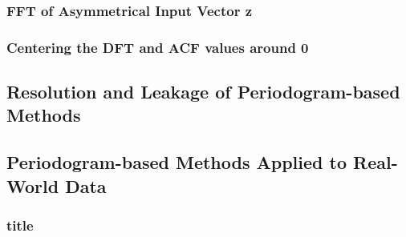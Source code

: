\documentclass[main.tex]{subfiles}
\begin{document}
\subsubsection{FFT of Asymmetrical Input Vector z}

\subsubsection{Centering the DFT and ACF values around 0}










\subsection{Resolution and Leakage of Periodogram-based Methods}











\subsection{Periodogram-based Methods Applied to Real-World Data}






\subsubsection{title}


\clearpage
\end{document}
